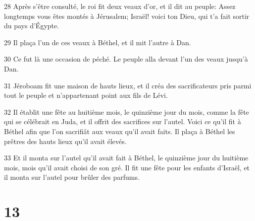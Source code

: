 \par 28 Après s'être consulté, le roi fit deux veaux d'or, et il dit au peuple: Assez longtemps vous êtes montés à Jérusalem; Israël! voici ton Dieu, qui t'a fait sortir du pays d'Égypte.
\par 29 Il plaça l'un de ces veaux à Béthel, et il mit l'autre à Dan.
\par 30 Ce fut là une occasion de péché. Le peuple alla devant l'un des veaux jusqu'à Dan.
\par 31 Jéroboam fit une maison de hauts lieux, et il créa des sacrificateurs pris parmi tout le peuple et n'appartenant point aux fils de Lévi.
\par 32 Il établit une fête au huitième mois, le quinzième jour du mois, comme la fête qui se célébrait en Juda, et il offrit des sacrifices sur l'autel. Voici ce qu'il fit à Béthel afin que l'on sacrifiât aux veaux qu'il avait faits. Il plaça à Béthel les prêtres des hauts lieux qu'il avait élevés.
\par 33 Et il monta sur l'autel qu'il avait fait à Béthel, le quinzième jour du huitième mois, mois qu'il avait choisi de son gré. Il fit une fête pour les enfants d'Israël, et il monta sur l'autel pour brûler des parfums.

\chapter{13}

